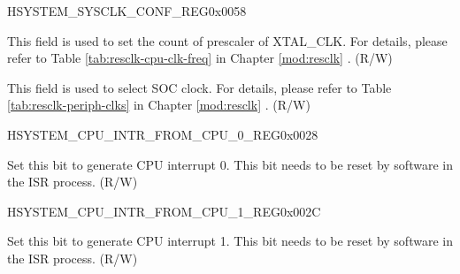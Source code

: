\begin{register}{H}{SYSTEM\_SYSCLK\_CONF\_REG}{0x0058}\label{regdesc:SYSTEMSYSCLKCONFREG}
%
%
%
%
\regnewline%
\begin{regdesc}\begin{reglist}
\label{fielddesc:SYSTEMPREDIVCNT}\item [SYSTEM\_PRE\_DIV\_CNT] This field is used to set the count of prescaler of XTAL\_CLK. For details, please refer to Table \ref{tab:resclk-cpu-clk-freq} in Chapter \ref{mod:resclk} \textit{}. (R/W)
\label{fielddesc:SYSTEMSOCCLKSEL}\item [SYSTEM\_SOC\_CLK\_SEL] This field is used to select SOC clock. For details, please refer to Table \ref{tab:resclk-periph-clks} in Chapter \ref{mod:resclk} \textit{}. (R/W)
\end{reglist}\end{regdesc}
\end{register}


\begin{register}{H}{SYSTEM\_CPU\_INTR\_FROM\_CPU\_0\_REG}{0x0028}\label{regdesc:SYSTEMCPUINTRFROMCPU0REG}
%
%
\regnewline%
\begin{regdesc}\begin{reglist}
\label{fielddesc:SYSTEMCPUINTRFROMCPU0}\item [SYSTEM\_CPU\_INTR\_FROM\_CPU\_0] Set this bit to generate CPU interrupt 0. This bit needs to be reset by software in the ISR process. (R/W)
\end{reglist}\end{regdesc}
\end{register}


\begin{register}{H}{SYSTEM\_CPU\_INTR\_FROM\_CPU\_1\_REG}{0x002C}\label{regdesc:SYSTEMCPUINTRFROMCPU1REG}
%
%
\regnewline%
\begin{regdesc}\begin{reglist}
\label{fielddesc:SYSTEMCPUINTRFROMCPU1}\item [SYSTEM\_CPU\_INTR\_FROM\_CPU\_1] Set this bit to generate CPU interrupt 1. This bit needs to be reset by software in the ISR process. (R/W)
\end{reglist}\end{regdesc}
\end{register}


